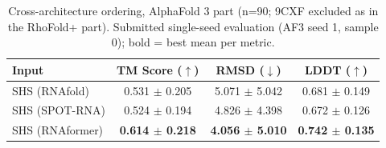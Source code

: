 \begin{table}[htbp]
\centering
\caption{Cross-architecture ordering, AlphaFold 3 part (n=90; 9CXF excluded as in the RhoFold+ part). Submitted single-seed evaluation (AF3 seed 1, sample 0); bold = best mean per metric.}
\label{tab:order_rna_single_chain_af3}
\begin{tabular}{lccc}
\toprule
Input & TM Score ($\uparrow$) & RMSD ($\downarrow$) & LDDT ($\uparrow$) \\
\midrule
SHS (RNAfold) & 0.531 $\pm$ 0.205 & 5.071 $\pm$ 5.042 & 0.681 $\pm$ 0.149 \\
SHS (SPOT-RNA) & 0.524 $\pm$ 0.194 & 4.826 $\pm$ 4.398 & 0.672 $\pm$ 0.126 \\
SHS (RNAformer) & \textbf{0.614 $\pm$ 0.218} & \textbf{4.056 $\pm$ 5.010} & \textbf{0.742 $\pm$ 0.135} \\
\bottomrule
\end{tabular}
\end{table}

